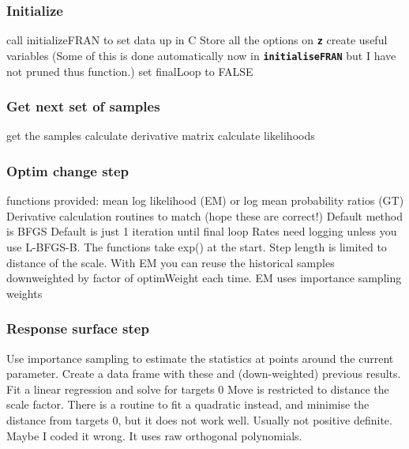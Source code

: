 \documentclass[12pt, a4paper]{article}
\renewcommand{\=}{\,=\,}
\newcommand{\+}{\,+\,}
\newcommand{\sfn}[1]{\textbf{\texttt{#1}}}
\begin{document}
\subsubsection{Initialize}
\label{sec:init}
\begin{algorithmic}
\STATE call initializeFRAN to set data up in C
\STATE Store all the options on \sfn{z}
\STATE create useful variables (Some of this is done automatically now in
  \sfn{initialiseFRAN} but I have not pruned thus function.)
\STATE set finalLoop to FALSE
\end{algorithmic}
\subsubsection{Get next set of samples}
\label{sec:samples}
\begin{algorithmic}
\STATE get the samples
\STATE calculate derivative matrix
\STATE calculate likelihoods
\end{algorithmic}
\subsubsection{Optim change step}
\label{sec:optim}
\begin{algorithmic}
 functions provided: mean log likelihood (EM) or log mean
probability ratios (GT)
\STATE Derivative calculation routines to match (hope these are correct!)
\STATE Default method is BFGS
\STATE Default is just 1 iteration until final loop
\STATE Rates need logging unless you use L-BFGS-B. The functions take exp() at
the start.
\STATE Step length is limited to distance of the scale.
\STATE With EM you can reuse the historical samples downweighted by factor of
optimWeight each time.
\STATE EM uses importance sampling weights
\end{algorithmic}
\subsubsection{Response surface step}
\label{sec:resp}
\begin{algorithmic}
\STATE Use importance sampling to estimate the statistics at points around the
current parameter.
\STATE Create a data frame with these and (down-weighted) previous results.
\STATE Fit a linear regression and solve for targets 0
\STATE Move is restricted to distance the scale factor.
\STATE There is a routine to fit a quadratic instead, and minimise the distance
from targets 0, but it does not work well. Usually not positive definite. Maybe
I coded it wrong. It uses raw orthogonal polynomials.
\end{algorithmic}
\end{document}
